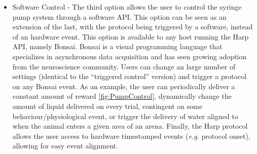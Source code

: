 \begin{itemize}
\item{Software Control} - The third option allows the user to control the syringe pump system through a software API. This option can be seen as an extension of the last, with the protocol being triggered by a software, instead of an hardware event. This option is available to any host running the Harp API, namely Bonsai. Bonsai is a visual programming language that specializes in asynchronous data acquisition and has seen growing adoption from the neuroscience community. Users can change an large number of settings (identical to the “triggered control” version) and trigger a protocol on any Bonsai event. As an example, the user can periodically deliver a constant amount of reward \ref{fig:PumpControl}, dynamically change the amount of liquid delivered on every trial, contingent on some behaviour/physiological event, or trigger the delivery of water aligned to when the animal enters a given area of an arena.
Finally, the Harp protocol allows the user access to hardware timestamped events (\textit{e.g.} protocol onset), allowing for easy event alignment.


\end{itemize}
